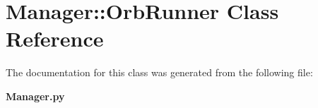 \section{Manager::Orb\-Runner Class Reference}
\label{classManager_1_1OrbRunner}


The documentation for this class was generated from the following file:\begin{CompactItemize}
\item 
{\bf Manager.py}\end{CompactItemize}
